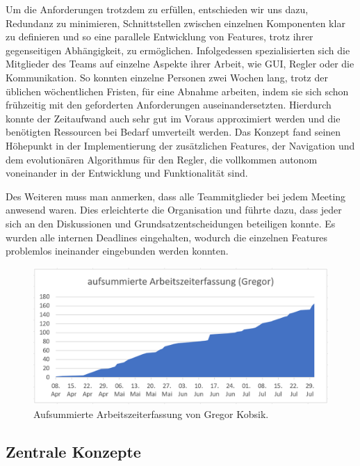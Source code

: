 \documentclass[oneside,abstractoff,a4paper]{scrartcl}
\begin{document}
Um die Anforderungen trotzdem zu erfüllen, entschieden wir uns dazu, Redundanz zu minimieren, Schnittstellen zwischen einzelnen Komponenten klar zu definieren und so eine parallele Entwicklung von Features, trotz ihrer gegenseitigen Abhängigkeit, zu ermöglichen. Infolgedessen spezialisierten sich die Mitglieder des Teams auf einzelne Aspekte ihrer Arbeit, wie GUI, Regler oder die Kommunikation. So konnten einzelne Personen zwei Wochen lang, trotz der üblichen wöchentlichen Fristen, für eine Abnahme arbeiten, indem sie sich schon frühzeitig mit den geforderten Anforderungen auseinandersetzten. Hierdurch konnte der Zeitaufwand auch sehr gut im Voraus approximiert werden und die benötigten Ressourcen bei Bedarf umverteilt werden. Das Konzept fand seinen Höhepunkt in der Implementierung der zusätzlichen Features, der Navigation und dem evolutionären Algorithmus für den Regler, die vollkommen autonom voneinander in der Entwicklung und Funktionalität sind. 

Des Weiteren muss man anmerken, dass alle Teammitglieder bei jedem Meeting anwesend waren. Dies erleichterte die Organisation und führte dazu, dass jeder sich an den Diskussionen und Grundsatzentscheidungen beteiligen konnte. Es wurden alle internen Deadlines eingehalten, wodurch die einzelnen Features problemlos ineinander eingebunden werden konnten.

\begin{figure}
	\includegraphics[width=\textwidth]{Arbeitszeiterfassung.PNG}
    \caption{Aufsummierte Arbeitszeiterfassung von Gregor Kobsik.}
    \label{fig:Arbeitszeiterfassung}
\end{figure}

\subsection{Zentrale Konzepte}
\end{document}
